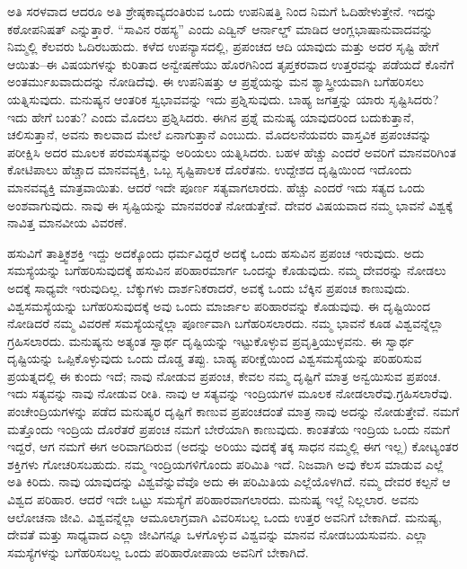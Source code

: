 ಅತಿ ಸರಳವಾದ ಆದರೂ ಅತಿ ಶ್ರೇಷ್ಠಕಾವ್ಯದಂತಿರುವ ಒಂದು ಉಪನಿಷತ್ತಿ ನಿಂದ ನಿಮಗೆ ಓದಿಹೇಳುತ್ತೇನೆ. ಇದನ್ನು ಕಠೋಪನಿಷತ್​ ಎನ್ನುತ್ತಾರೆ. “ಸಾವಿನ ರಹಸ್ಯ” ಎಂದು ಎಡ್ವಿನ್​ ಆರ್ನಾಲ್ಡ್​ ಮಾಡಿದ ಆಂಗ್ಲಭಾಷಾನುವಾದವನ್ನು ನಿಮ್ಮಲ್ಲಿ ಕೆಲವರು ಓದಿರಬಹುದು. ಕಳೆದ ಉಪನ್ಯಾಸದಲ್ಲಿ, ಪ್ರಪಂಚದ ಆದಿ ಯಾವುದು ಮತ್ತು ಅದರ ಸೃಷ್ಟಿ ಹೇಗೆ ಆಯಿತು–ಈ ವಿಷಯಗಳನ್ನು ಕುರಿತಾದ ಅನ್ವೇಷಣೆಯು ಹೊರಗಿನಿಂದ ತೃಪ್ತಕರವಾದ ಉತ್ತರವನ್ನು ಪಡೆಯದೆ ಕೊನೆಗೆ ಅಂತರ್ಮುಖವಾದುದನ್ನು ನೋಡಿದೆವು. ಈ ಉಪನಿಷತ್ತು ಆ ಪ್ರಶ್ನೆಯನ್ನು ಮನ ಶ್ಯಾಸ್ತ್ರೀಯವಾಗಿ ಬಗೆಹರಿಸಲು ಯತ್ನಿಸುವುದು. ಮನುಷ್ಯನ ಆಂತರಿಕ ಸ್ವಭಾವವನ್ನು ಇದು ಪ್ರಶ್ನಿಸುವುದು. ಬಾಹ್ಯ ಜಗತ್ತನ್ನು ಯಾರು ಸೃಷ್ಟಿಸಿದರು? ಇದು ಹೇಗೆ ಬಂತು? ಎಂದು ಮೊದಲು ಪ್ರಶ್ನಿಸಿದರು. ಈಗಿನ ಪ್ರಶ್ನೆ ಮನುಷ್ಯ ಯಾವುದರಿಂದ ಬದುಕುತ್ತಾನೆ, ಚಲಿಸುತ್ತಾನೆ, ಅವನು ಕಾಲವಾದ ಮೇಲೆ ಏನಾಗುತ್ತಾನೆ ಎಂಬುದು. ಮೊದಲನೆಯವರು ವಾಸ್ತವಿಕ ಪ್ರಪಂಚವನ್ನು ಪರೀಕ್ಷಿಸಿ ಅದರ ಮೂಲಕ ಪರಮಸತ್ಯವನ್ನು ಅರಿಯಲು ಯತ್ನಿಸಿದರು. ಬಹಳ ಹೆಚ್ಚು ಎಂದರೆ ಅವರಿಗೆ ಮಾನವರಿಗಿಂತ ಕೋಟಿಪಾಲು ಹೆಚ್ಚಾದ ಮಾನವವ್ಯಕ್ತಿ, ಒಬ್ಬ ಸೃಷ್ಟಿಪಾಲಕ ದೊರೆತನು. ಉದ್ದೇಶದ ದೃಷ್ಟಿಯಿಂದ ಇದೊಂದು ಮಾನವವ್ಯಕ್ತಿ ಮಾತ್ರವಾಯಿತು. ಆದರೆ ಇದೇ ಪೂರ್ಣ ಸತ್ಯವಾಗಲಾರದು. ಹೆಚ್ಚು ಎಂದರೆ ಇದು ಸತ್ಯದ ಒಂದು ಅಂಶವಾಗುವುದು. ನಾವು ಈ ಸೃಷ್ಟಿಯನ್ನು ಮಾನವರಂತೆ ನೋಡುತ್ತೇವೆ. ದೇವರ ವಿಷಯವಾದ ನಮ್ಮ ಭಾವನೆ ವಿಶ್ವಕ್ಕೆ ನಾವಿತ್ತ ಮಾನವೀಯ ವಿವರಣೆ.

ಹಸುವಿಗೆ ತಾತ್ತ್ವಿಕಶಕ್ತಿ ಇದ್ದು ಅದಕ್ಕೊಂದು ಧರ್ಮವಿದ್ದರೆ ಅದಕ್ಕೆ ಒಂದು ಹಸುವಿನ ಪ್ರಪಂಚ ಇರುವುದು. ಅದು ಸಮಸ್ಯೆಯನ್ನು ಬಗೆಹರಿಸುವುದಕ್ಕೆ ಹಸುವಿನ ಪರಿಹಾರಮಾರ್ಗ ಒಂದನ್ನು ಕೊಡುವುದು. ನಮ್ಮ ದೇವರನ್ನು ನೋಡಲು ಅದಕ್ಕೆ ಸಾಧ್ಯವೇ ಇರುವುದಿಲ್ಲ. ಬೆಕ್ಕುಗಳು ದಾರ್ಶನಿಕರಾದರೆ, ಅವಕ್ಕೆ ಒಂದು ಬೆಕ್ಕಿನ ಪ್ರಪಂಚ ಕಾಣುವುದು. ವಿಶ್ವಸಮಸ್ಯೆಯನ್ನು ಬಗೆಹರಿಸುವುದಕ್ಕೆ ಅವು ಒಂದು ಮಾರ್ಜಾಲ ಪರಿಹಾರವನ್ನು ಕೊಡುವುವು. ಈ ದೃಷ್ಟಿಯಿಂದ ನೋಡಿದರೆ ನಮ್ಮ ವಿವರಣೆ ಸಮಸ್ಯೆಯನ್ನೆಲ್ಲಾ ಪೂರ್ಣವಾಗಿ ಬಗೆಹರಿಸಲಾರದು. ನಮ್ಮ ಭಾವನೆ ಕೂಡ ವಿಶ್ವವನ್ನೆಲ್ಲಾ ಗ್ರಹಿಸಲಾರದು. ಮನುಷ್ಯನು ಅತ್ಯಂತ ಸ್ವಾರ್ಥ ದೃಷ್ಟಿಯನ್ನು ಇಟ್ಟುಕೊಳ್ಳುವ ಪ್ರವೃತ್ತಿಯುಳ್ಳವನು. ಈ ಸ್ವಾರ್ಥ ದೃಷ್ಟಿಯನ್ನು ಒಪ್ಪಿಕೊಳ್ಳುವುದು ಒಂದು ದೊಡ್ಡ ತಪ್ಪು. ಬಾಹ್ಯ ಪರೀಕ್ಷೆಯಿಂದ ವಿಶ್ವಸಮಸ್ಯೆಯನ್ನು ಪರಿಹರಿಸುವ ಪ್ರಯತ್ನದಲ್ಲಿ ಈ ಕುಂದು ಇದೆ; ನಾವು ನೋಡುವ ಪ್ರಪಂಚ, ಕೇವಲ ನಮ್ಮ ದೃಷ್ಟಿಗೆ ಮಾತ್ರ ಅನ್ವಯಿಸುವ ಪ್ರಪಂಚ. ಇದು ಸತ್ಯವನ್ನು ನಾವು ನೋಡುವ ರೀತಿ. ನಾವು ಆ ಸತ್ಯವನ್ನು ಇಂದ್ರಿಯಗಳ ಮೂಲಕ ನೋಡಲಾರೆವು.ಗ್ರಹಿಸಲಾರೆವು. ಪಂಚೇಂದ್ರಿಯಗಳನ್ನು ಪಡೆದ ಮನುಷ್ಯರ ದೃಷ್ಟಿಗೆ ಕಾಣುವ ಪ್ರಪಂಚದಂತೆ ಮಾತ್ರ ನಾವು ಅದನ್ನು ನೋಡುತ್ತೇವೆ. ನಮಗೆ ಮತ್ತೊಂದು ಇಂದ್ರಿಯ ದೊರೆತರೆ ಪ್ರಪಂಚ ನಮಗೆ ಬೇರೆಯಾಗಿ ಕಾಣುವುದು. ಕಾಂತತೆಯ ಇಂದ್ರಿಯ ಒಂದು ನಮಗೆ ಇದ್ದರೆ, ಆಗ ನಮಗೆ ಈಗ ಅರಿವಾಗದಿರುವ (ಅದನ್ನು ಅರಿಯು ವುದಕ್ಕೆ ತಕ್ಕ ಸಾಧನ ನಮ್ಮಲ್ಲಿ ಈಗ ಇಲ್ಲ) ಕೋಟ್ಯಂತರ ಶಕ್ತಿಗಳು ಗೋಚರಿಸಬಹುದು. ನಮ್ಮ ಇಂದ್ರಿಯಗಳಿಗೊಂದು ಪರಿಮಿತಿ ಇದೆ. ನಿಜವಾಗಿ ಅವು ಕೆಲಸ ಮಾಡುವ ಎಲ್ಲೆ ಅತಿ ಕಿರಿದು. ನಾವು ಯಾವುದನ್ನು ವಿಶ್ವವೆನ್ನುವೆವೊ ಅದು ಈ ಪರಿಮಿತಿಯ ಎಲ್ಲೆಯೊಳಗಿದೆ. ನಮ್ಮ ದೇವರ ಕಲ್ಪನೆ ಆ ವಿಶ್ವದ ಪರಿಹಾರ. ಆದರೆ ಇದೇ ಒಟ್ಟು ಸಮಸ್ಯೆಗೆ ಪರಿಹಾರವಾಗಲಾರದು. ಮನುಷ್ಯ ಇಲ್ಲೆ ನಿಲ್ಲಲಾರ. ಅವನು ಆಲೋಚನಾ ಜೀವಿ. ವಿಶ್ವವನ್ನೆಲ್ಲಾ ಆಮೂಲಾಗ್ರವಾಗಿ ವಿವರಿಸಬಲ್ಲ ಒಂದು ಉತ್ತರ ಅವನಿಗೆ ಬೇಕಾಗಿದೆ. ಮನುಷ್ಯ, ದೇವತೆ ಮತ್ತು ಸಾಧ್ಯವಾದ ಎಲ್ಲಾ ಜೀವಿಗನ್ನೂ ಒಳಗೊಳ್ಳುವ ವಿಶ್ವವನ್ನು ಮಾನವ ನೋಡಬಯಸುವನು. ಎಲ್ಲಾ ಸಮಸ್ಯೆಗಳನ್ನು ಬಗೆಹರಿಸಬಲ್ಲ ಒಂದು ಪರಿಹಾರೋಪಾಯ ಅವನಿಗೆ ಬೇಕಾಗಿದೆ.


